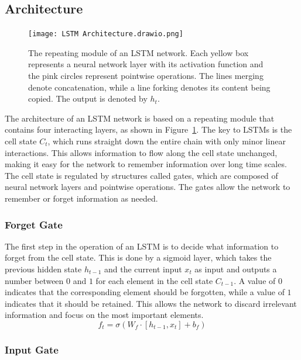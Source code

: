 \documentclass{article}
\newcommand{\reffig}[1]{Figure~\ref{#1}}
\begin{document}
\subsection{Architecture}
\label{sec:3.0}

\begin{figure}
  \centering
  \texttt{[image: LSTM Architecture.drawio.png]}
  \caption{The repeating module of an LSTM network. Each yellow box represents a neural
    network layer with its activation function and the pink circles represent pointwise
    operations. The lines merging denote concatenation, while a line forking denotes its
    content being copied. The output is denoted by $h_t$. \cite{olahUnderstandingLSTM}}
  \label{fig:lstm}
\end{figure}

The architecture of an LSTM network is based on a repeating module that contains four
interacting layers, as shown in \reffig{fig:lstm}. The key to LSTMs is the cell state
$C_t$, which runs straight down the entire chain with only minor linear interactions. This
allows information to flow along the cell state unchanged, making it easy for the network
to remember information over long time scales. The cell state is regulated by structures
called gates, which are composed of neural network layers and pointwise operations. The
gates allow the network to remember or forget information as needed.


\subsubsection{Forget Gate}
\label{sec:3.0.0}

The first step in the operation of an LSTM is to decide what information to forget from
the cell state. This is done by a sigmoid layer, which takes the previous hidden state
$h_{t-1}$ and the current input $x_t$ as input and outputs a number between $0$ and $1$
for each element in the cell state $C_{t-1}$. A value of $0$ indicates that the
corresponding element should be forgotten, while a value of $1$ indicates that it should
be retained. This allows the network to discard irrelevant information and focus on the
most important elements.
\begin{equation}
  f_t = \sigma(W_f \cdot [h_{t-1}, x_t] + b_f)
\end{equation}


\subsubsection{Input Gate}
\label{sec:3.0.1}
\end{document}
